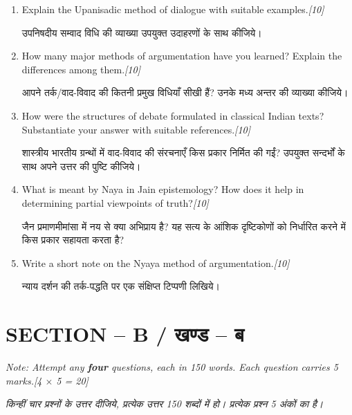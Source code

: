 \documentclass[11pt,a4paper]{article}
\newcommand{\pts}[1]{\hfill \textit{[#1]}}
\begin{document}
\begin{enumerate}[label=\textbf{\arabic*.},leftmargin=*,itemsep=12pt]

  \item Explain the Upanisadic method of dialogue with suitable examples.\pts{10}
  
  उपनिषदीय सम्वाद विधि की व्याख्या उपयुक्त उदाहरणों के साथ कीजिये।

  \item How many major methods of argumentation have you learned? Explain the differences among them.\pts{10}
  
  आपने तर्क/वाद-विवाद की कितनी प्रमुख विधियाँ सीखी हैं? उनके मध्य अन्तर की व्याख्या कीजिये।

  \item How were the structures of debate formulated in classical Indian texts? Substantiate your answer with suitable references.\pts{10}
  
  शास्त्रीय भारतीय ग्रन्थों में वाद-विवाद की संरचनाएँ किस प्रकार निर्मित की गईं? उपयुक्त सन्दर्भों के साथ अपने उत्तर की पुष्टि कीजिये।

  \item What is meant by Naya in Jain epistemology? How does it help in determining partial viewpoints of truth?\pts{10}
  
  जैन प्रमाणमीमांसा में नय से क्या अभिप्राय है? यह सत्य के आंशिक दृष्टिकोणों को निर्धारित करने में किस प्रकार सहायता करता है?

  \item Write a short note on the Nyaya method of argumentation.\pts{10}
  
  न्याय दर्शन की तर्क-पद्धति पर एक संक्षिप्त टिप्पणी लिखिये।

\end{enumerate}

\bigskip

\section*{SECTION -- B / खण्ड -- ब}
\noindent \textit{Note: Attempt any \textbf{four} questions, each in 150 words. Each question carries 5 marks.}\pts{4 $\times$ 5 = 20}

\noindent \textit{किन्हीं चार प्रश्नों के उत्तर दीजिये, प्रत्येक उत्तर 150 शब्दों में हो। प्रत्येक प्रश्न 5 अंकों का है।}
\end{document}
